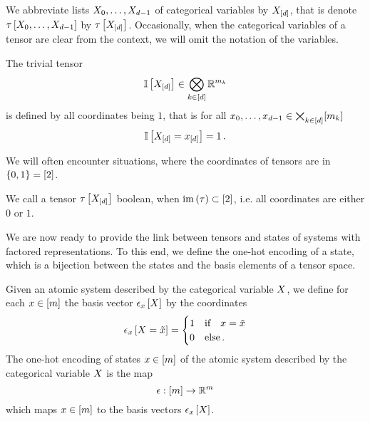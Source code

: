We abbreviate lists $X_{0},\ldots,X_{d-1}$ of categorical variables by $X_{[d]}$, that is denote $\tau\left[X_{0},\ldots,X_{d-1}\right]$ by $\tau\left[X_{[d]}\right]$.
Occasionally, when the categorical variables of a tensor are clear from the context, we will omit the notation of the variables. %

\begin{example}\label{exa:trivialTensor}
	The trivial tensor
	\begin{align*}
		 \mathbb{I}\left[X_{[d]}\right] \in \bigotimes_{k\in[d]} \mathbb{R}^{m_{k}}
	\end{align*}
	is defined by all coordinates being $1$, that is for all $x_{0},\ldots,x_{d-1}\in\bigtimes_{k\in[d]}[m_{k}]$
	\begin{align*}
		\mathbb{I}\left[X_{[d]}=x_{[d]}\right] = 1 \, .
	\end{align*}
\end{example}


We will often encounter situations, where the coordinates of tensors are in $\{0,1\}=[2]$.

\begin{definition}\label{def:booleanTensor}
	We call a tensor $\tau\left[X_{[d]}\right]$ boolean, when $\mathrm{im}\left(\tau\right)\subset[2]$, i.e. all coordinates are either $0$ or $1$.
\end{definition}


We are now ready to provide the link between tensors and states of systems with factored representations.
To this end, we define the one-hot encoding of a state, which is a bijection between the states and the basis elements of a tensor space.

\begin{definition}
	Given an atomic system described by the categorical variable $X$, we define for each $x\in[m]$ the basis vector $\epsilon_{x}\left[X\right]$ by the coordinates
	\begin{align}
		\epsilon_{x}\left[X=\tilde{x}\right] = \begin{cases}
			1 & \text{if} \quad x=\tilde{x} \\
			0 & \text{else} \, .
		\end{cases}
	\end{align}
	The one-hot encoding of states $x\in[m]$ of the atomic system described by the categorical variable $X$ is the map
		\[ \epsilon: [m] \rightarrow \mathbb{R}^m \]
	which maps $x \in [m]$ to the basis vectors $\epsilon_{x}\left[X\right]$.
\end{definition}

